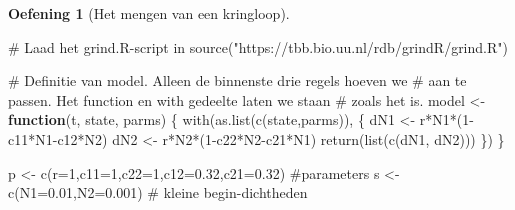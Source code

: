 \documentclass[
  a4paper,
]{scrbook}
\newenvironment{Shaded}{\begin{snugshade}}{\end{snugshade}}
\newcommand{\AttributeTok}[1]{\textcolor[rgb]{0.40,0.45,0.13}{#1}}
\newcommand{\CommentTok}[1]{\textcolor[rgb]{0.37,0.37,0.37}{#1}}
\newcommand{\ControlFlowTok}[1]{\textcolor[rgb]{0.00,0.23,0.31}{\textbf{#1}}}
\newcommand{\DecValTok}[1]{\textcolor[rgb]{0.68,0.00,0.00}{#1}}
\newcommand{\FloatTok}[1]{\textcolor[rgb]{0.68,0.00,0.00}{#1}}
\newcommand{\FunctionTok}[1]{\textcolor[rgb]{0.28,0.35,0.67}{#1}}
\newcommand{\NormalTok}[1]{\textcolor[rgb]{0.00,0.23,0.31}{#1}}
\newcommand{\OtherTok}[1]{\textcolor[rgb]{0.00,0.23,0.31}{#1}}
\newcommand{\SpecialCharTok}[1]{\textcolor[rgb]{0.37,0.37,0.37}{#1}}
\newcommand{\StringTok}[1]{\textcolor[rgb]{0.13,0.47,0.30}{#1}}
\theoremstyle{definition}
\newtheorem{exercise}{Oefening}[chapter]
\theoremstyle{remark}
\begin{document}
\begin{exercise}[Het mengen van een
kringloop]
\begin{Shaded}
\begin{Highlighting}[]
\CommentTok{\# Laad het grind.R{-}script in}
\FunctionTok{source}\NormalTok{(}\StringTok{"https://tbb.bio.uu.nl/rdb/grindR/grind.R"}\NormalTok{)}

\CommentTok{\# Definitie van model. Alleen de binnenste drie regels hoeven we }
\CommentTok{\# aan te passen. Het \textquotesingle{}function\textquotesingle{} en \textquotesingle{}with\textquotesingle{} gedeelte laten we staan}
\CommentTok{\# zoals het is. }
\NormalTok{model }\OtherTok{\textless{}{-}} \ControlFlowTok{function}\NormalTok{(t, state, parms) \{}
  \FunctionTok{with}\NormalTok{(}\FunctionTok{as.list}\NormalTok{(}\FunctionTok{c}\NormalTok{(state,parms)), \{}
\NormalTok{    dN1 }\OtherTok{\textless{}{-}}\NormalTok{ r}\SpecialCharTok{*}\NormalTok{N1}\SpecialCharTok{*}\NormalTok{(}\DecValTok{1}\SpecialCharTok{{-}}\NormalTok{c11}\SpecialCharTok{*}\NormalTok{N1}\SpecialCharTok{{-}}\NormalTok{c12}\SpecialCharTok{*}\NormalTok{N2)}
\NormalTok{    dN2 }\OtherTok{\textless{}{-}}\NormalTok{ r}\SpecialCharTok{*}\NormalTok{N2}\SpecialCharTok{*}\NormalTok{(}\DecValTok{1}\SpecialCharTok{{-}}\NormalTok{c22}\SpecialCharTok{*}\NormalTok{N2}\SpecialCharTok{{-}}\NormalTok{c21}\SpecialCharTok{*}\NormalTok{N1)}
    \FunctionTok{return}\NormalTok{(}\FunctionTok{list}\NormalTok{(}\FunctionTok{c}\NormalTok{(dN1, dN2)))  }
\NormalTok{  \}) }
\NormalTok{\}  }


\NormalTok{p }\OtherTok{\textless{}{-}} \FunctionTok{c}\NormalTok{(}\AttributeTok{r=}\DecValTok{1}\NormalTok{,}\AttributeTok{c11=}\DecValTok{1}\NormalTok{,}\AttributeTok{c22=}\DecValTok{1}\NormalTok{,}\AttributeTok{c12=}\FloatTok{0.32}\NormalTok{,}\AttributeTok{c21=}\FloatTok{0.32}\NormalTok{)  }\CommentTok{\#parameters}
\NormalTok{s }\OtherTok{\textless{}{-}} \FunctionTok{c}\NormalTok{(}\AttributeTok{N1=}\FloatTok{0.01}\NormalTok{,}\AttributeTok{N2=}\FloatTok{0.001}\NormalTok{) }\CommentTok{\# kleine begin{-}dichtheden}


\end{Highlighting}
\end{Shaded}
\end{exercise}
\end{document}
